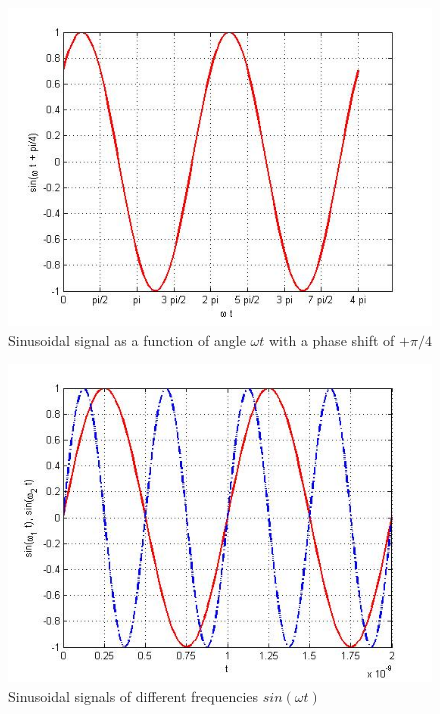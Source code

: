 \documentclass{ximera}
\begin{document}
\begin{figure}
\includegraphics[scale=0.4]{jpg/cpef5.jpg}
\caption{Sinusoidal signal as a function of angle $\omega t$ with a phase shift of $+\pi/4$}
\label{sinPlus45Ph}
\end{figure}



\begin{figure}
\includegraphics[scale=0.4]{jpg/cpef6.jpg}
\caption{Sinusoidal signals of different frequencies $sin ( \omega t)$}
\label{sinF1F2}
\end{figure}


\end{document}

